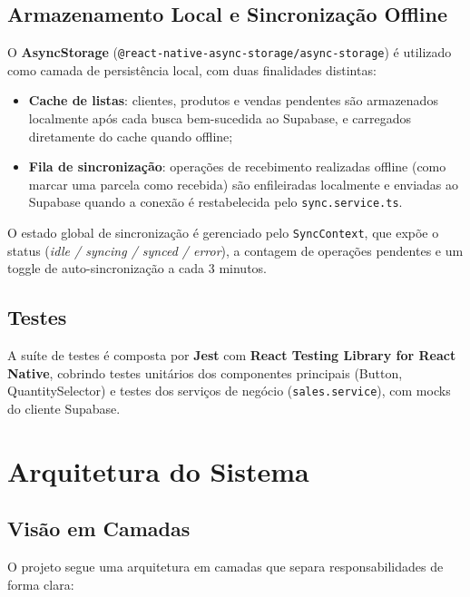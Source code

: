 \documentclass[
	12pt,				%
	oneside,			%
	a4paper,			%
	english,			%
	brazil				%
	]{abntex2}
\begin{document}
\section{Armazenamento Local e Sincronização Offline}

O \textbf{AsyncStorage} (\texttt{@react-native-async-storage/async-storage}) é utilizado como camada de persistência local, com duas finalidades distintas:

\begin{itemize}
  \item \textbf{Cache de listas}: clientes, produtos e vendas pendentes são armazenados localmente após cada busca bem-sucedida ao Supabase, e carregados diretamente do cache quando offline;
  \item \textbf{Fila de sincronização}: operações de recebimento realizadas offline (como marcar uma parcela como recebida) são enfileiradas localmente e enviadas ao Supabase quando a conexão é restabelecida pelo \texttt{sync.service.ts}.
\end{itemize}

O estado global de sincronização é gerenciado pelo \texttt{SyncContext}, que expõe o status (\textit{idle / syncing / synced / error}), a contagem de operações pendentes e um toggle de auto-sincronização a cada 3 minutos.

\section{Testes}

A suíte de testes é composta por \textbf{Jest} com \textbf{React Testing Library for React Native}, cobrindo testes unitários dos componentes principais (Button, QuantitySelector) e testes dos serviços de negócio (\texttt{sales.service}), com mocks do cliente Supabase.

\chapter{Arquitetura do Sistema}

\section{Visão em Camadas}

O projeto segue uma arquitetura em camadas que separa responsabilidades de forma clara:
\end{document}
